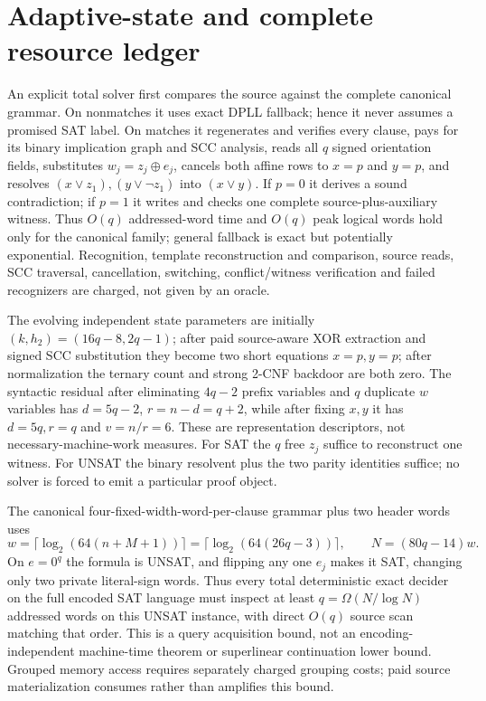 \documentclass[11pt]{article}
\begin{document}
\section{Adaptive-state and complete resource ledger}
An explicit total solver first compares the source against the complete canonical grammar. On nonmatches it uses exact DPLL fallback; hence it never assumes a promised SAT label. On matches it regenerates and verifies every clause, pays for its binary implication graph and SCC analysis, reads all $q$ signed orientation fields, substitutes $w_j=z_j\oplus e_j$, cancels both affine rows to $x=p$ and $y=p$, and resolves $(x\vee z_1),(y\vee\neg z_1)$ into $(x\vee y)$. If $p=0$ it derives a sound contradiction; if $p=1$ it writes and checks one complete source-plus-auxiliary witness. Thus $O(q)$ addressed-word time and $O(q)$ peak logical words hold only for the canonical family; general fallback is exact but potentially exponential. Recognition, template reconstruction and comparison, source reads, SCC traversal, cancellation, switching, conflict/witness verification and failed recognizers are charged, not given by an oracle.

The evolving independent state parameters are initially $(k,h_2)=(16q-8,2q-1)$; after paid source-aware XOR extraction and signed SCC substitution they become two short equations $x=p,y=p$; after normalization the ternary count and strong 2-CNF backdoor are both zero. The syntactic residual after eliminating $4q-2$ prefix variables and $q$ duplicate $w$ variables has $d=5q-2$, $r=n-d=q+2$, while after fixing $x,y$ it has $d=5q,r=q$ and $v=n/r=6$. These are representation descriptors, not necessary-machine-work measures. For SAT the $q$ free $z_j$ suffice to reconstruct one witness. For UNSAT the binary resolvent plus the two parity identities suffice; no solver is forced to emit a particular proof object.

The canonical four-fixed-width-word-per-clause grammar plus two header words uses
\[
w=\lceil\log_2(64(n+M+1))\rceil
=\lceil\log_2(64(26q-3))\rceil,
\qquad
\boxed{N=(80q-14)w}.
\]
On $e=0^q$ the formula is UNSAT, and flipping any one $e_j$ makes it SAT, changing only two private literal-sign words. Thus every total deterministic exact decider on the full encoded SAT language must inspect at least $q=\Omega(N/\log N)$ addressed words on this UNSAT instance, with direct $O(q)$ source scan matching that order. This is a query acquisition bound, not an encoding-independent machine-time theorem or superlinear continuation lower bound. Grouped memory access requires separately charged grouping costs; paid source materialization consumes rather than amplifies this bound.
\end{document}
